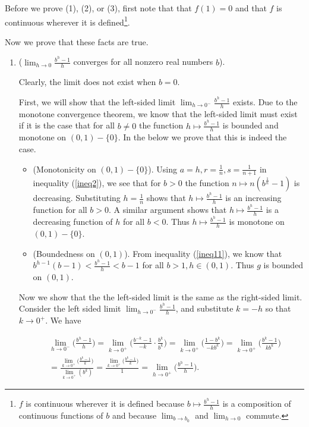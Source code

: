 \documentclass{article}
\begin{document}
Before we prove (1), (2), or (3), first note that that $f(1) = 0$ and that $f$ is continuous wherever it is defined\footnote{$f$ is continuous wherever it is defined because $b \mapsto \frac{b^h - 1}{h}$ is a composition of continuous functions of $b$ and because $\lim_{b \rightarrow b_0}$ and $\lim_{h \rightarrow 0}$ commute.}. 

\vspace{.25cm}

Now we prove that these facts are true.

\begin{enumerate}
    \item ($\lim_{h \rightarrow 0} \frac{b^h - 1}{h}$ converges for all nonzero real numbers $b$).
    
    Clearly, the limit does not exist when $b = 0$. 
        
    First, we will show that the left-sided limit $\lim_{h \rightarrow 0^-} \frac{b^h - 1}{h}$ exists. Due to the monotone convergence theorem, we know that the left-sided limit must exist if it is the case that for all $b \neq 0$ the function $h \mapsto \frac{b^h - 1}{h}$ is bounded and monotone on $(0, 1) - \{0\}$. In the below we prove that this is indeed the case.
    
    \begin{itemize}
        \item (Monotonicity on $(0, 1) - \{0\}$). Using $a = h, r = \frac{1}{n}, s = \frac{1}{n + 1}$ in inequality (\ref{ineq2}), we see that for $b > 0$ the function $n \mapsto n(b^{\frac{1}{n}} - 1)$ is decreasing. Substituting $h = \frac{1}{n}$ shows that $h \mapsto \frac{b^h - 1}{h}$ is an increasing function for all $b > 0$. A similar argument shows that $h \mapsto \frac{b^h - 1}{h}$ is a decreasing function of $h$ for all $b < 0$. Thus $h \mapsto \frac{b^h - 1}{h}$ is monotone on $(0, 1) - \{0\}$.
        \item (Boundedness on $(0, 1)$). From inequality (\ref{ineq11}), we know that $b^{h - 1}(b - 1) < \frac{b^h - 1}{h} < b - 1$ for all $b > 1, h \in (0, 1)$. Thus $g$ is bounded on $(0, 1)$.
    \end{itemize}
    
    Now we show that the the left-sided limit is the same as the right-sided limit. Consider the left sided limit $\lim_{h \rightarrow 0^-} \frac{b^h - 1}{h}$, and substitute $k = -h$ so that $k \rightarrow 0^+$. We have
    
    \begin{align*}
        &\lim_{h \rightarrow 0^-} \Big( \frac{b^h - 1}{h} \Big) 
        = \lim_{k \rightarrow 0^+} \Big( \frac{b^{-k} - 1}{-k} \cdot \frac{b^k}{b^k} \Big) 
        = \lim_{k \rightarrow 0^+} \Big( \frac{1 - b^k}{-kb^k} \Big)
        = \lim_{k \rightarrow 0^+} \Big( \frac{b^k - 1}{kb^k} \Big) \\ 
        &= \frac{\lim_{k \rightarrow 0^+} \Big( \frac{b^k - 1}{k} \Big)}{\lim_{k \rightarrow 0^+} (b^k)}
        = \frac{\lim_{k \rightarrow 0^+} \Big( \frac{b^k - 1}{k} \Big)}{1}
        = \lim_{h \rightarrow 0^+} \Big( \frac{b^h - 1}{h} \Big).
    \end{align*}
    

\end{enumerate}
\end{document}

